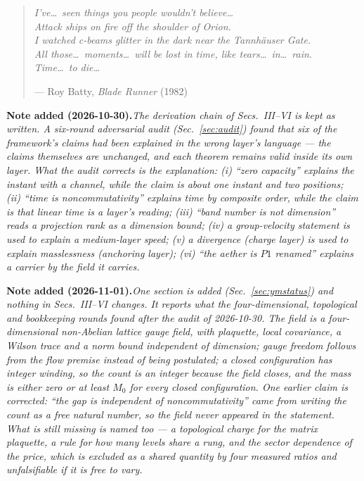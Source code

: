 \documentclass[aps,prd,preprint,superscriptaddress,amsmath,amssymb]{revtex4-2}
\begin{document}
\maketitle

\begin{quote}
\itshape
I've\dots\ seen things you people wouldn't believe\dots\\
Attack ships on fire off the shoulder of Orion.\\
I watched c-beams glitter in the dark near the Tannh\"auser Gate.\\
All those\dots\ moments\dots\ will be lost in time, like tears\dots\ in\dots\ rain.\\
Time\dots\ to die\dots
\par
\vspace{0.4em}
--- Roy Batty, \emph{Blade Runner} (1982)
\end{quote}

\noindent\textbf{Note added (2026-10-30).}\emph{The derivation chain of
Secs.~III--VI is kept as written.  A six-round adversarial audit
(Sec.~\ref{sec:audit}) found that six of the framework's claims had been
\emph{explained} in the wrong layer's language --- the claims themselves are
unchanged, and each theorem remains valid inside its own layer.  What the audit
corrects is the explanation: (i) ``zero capacity'' explains the instant with a
channel, while the claim is about one instant and two positions; (ii) ``time is
noncommutativity'' explains time by composite order, while the claim is that
linear time is a layer's reading; (iii) ``band number is not dimension'' reads a
projection rank as a dimension bound; (iv) a group-velocity statement is used to
explain a medium-layer speed; (v) a divergence (charge layer) is used to explain
masslessness (anchoring layer); (vi) ``the aether is $P1$ renamed'' explains a
carrier by the field it carries.}

\noindent\textbf{Note added (2026-11-01).}\emph{One section is added
(Sec.~\ref{sec:ymstatus}) and nothing in Secs.~III--VI changes.  It
reports what the four-dimensional, topological and bookkeeping rounds
found after the audit of 2026-10-30.  The field is a four-dimensional
non-Abelian lattice gauge field, with plaquette, local covariance, a
Wilson trace and a norm bound independent of dimension; gauge freedom
follows from the flow premise instead of being postulated; a closed
configuration has integer winding, so the count is an integer because the
field closes, and the mass is either zero or at least $M_0$ for every
closed configuration.  One earlier claim is corrected: ``the gap is
independent of noncommutativity'' came from writing the count as a free
natural number, so the field never appeared in the statement.  What is
still missing is named too --- a topological charge for the matrix
plaquette, a rule for how many levels share a rung, and the sector
dependence of the price, which is excluded as a shared quantity by four
measured ratios and unfalsifiable if it is free to vary.}
\end{document}
